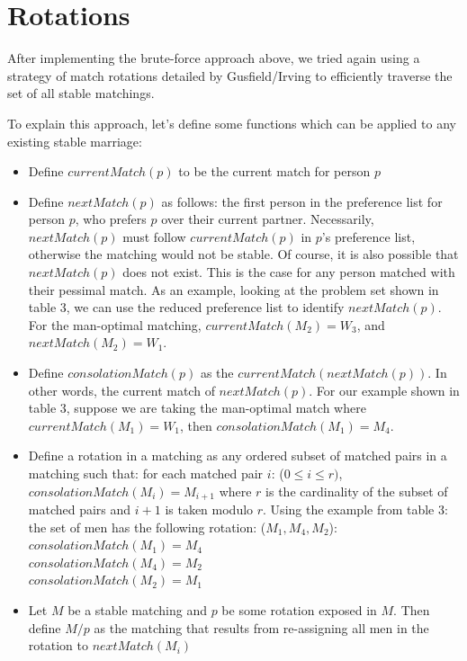\documentclass[a4paper]{article}
\begin{document}
\section{Rotations}
After implementing the brute-force approach above, we tried again using a strategy of match rotations detailed by Gusfield/Irving \cite{gusfield} to efficiently traverse the set of all stable matchings.

To explain this approach, let's define some functions which can be applied to any existing stable marriage:
\begin{itemize}
    \item Define $currentMatch(p)$ to be the current match for person $p$
    \item Define $nextMatch(p)$ as follows: the first person in the preference list for person $p$, who prefers $p$ over their current partner. Necessarily, $nextMatch(p)$ must follow $currentMatch(p)$ in $p$'s preference list, otherwise the matching would not be stable. Of course, it is also possible that $nextMatch(p)$ does not exist. This is the case for any person matched with their pessimal match. As an example, looking at the problem set shown in table 3, we can use the reduced preference list to identify $nextMatch(p)$.  For the man-optimal matching, $currentMatch(M_2) = W_3$, and $nextMatch(M_2) = W_1$.
    \item Define $consolationMatch(p)$ as the $currentMatch(nextMatch(p))$. In other words, the current match of $nextMatch(p)$. For our example shown in table 3, suppose we are taking the man-optimal match where $currentMatch(M_1) = W_1$, then $consolationMatch(M_1) = M_4$.
    \item Define a rotation in a matching as any ordered subset of matched pairs in a matching such that: for each matched pair $i$: ($0 \leq i \leq r)$, $consolationMatch(M_i) = M_{i+1}$ where $r$ is the cardinality of the subset of matched pairs and $i+1$ is taken modulo $r$. Using the example from table 3: the set of men has the following rotation: ($M_1, M_4, M_2$): \\
    $consolationMatch(M_1) = M_4$ \\
    $consolationMatch(M_4) = M_2$ \\
    $consolationMatch(M_2) = M_1$
    \item Let $M$ be a stable matching and $p$ be some rotation exposed in $M$. Then define $M / p$ as the matching that results from re-assigning all men in the rotation to $nextMatch(M_i)$

\end{itemize}
\end{document}
